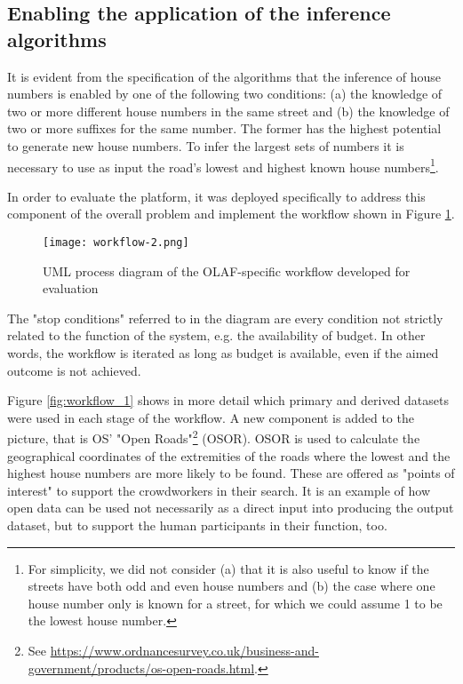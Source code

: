 \subsection{Enabling the application of the inference algorithms} 

It is evident from the specification of the algorithms that the inference of house numbers is enabled by one of the following two conditions: (a) the knowledge of two or more different house numbers in the same street and (b) the knowledge of two or more suffixes for the same number. The former has the highest potential to generate new house numbers. To infer the largest sets of numbers it is necessary to use as input the road's lowest and highest known house numbers\footnote{For simplicity, we did not consider (a) that it is also useful to know if the streets have both odd and even house numbers and (b) the case where one house number only is known for a street, for which we could assume 1 to be the lowest house number.}.

In order to evaluate the platform, it was deployed specifically to address this component of the overall problem and implement the workflow shown in Figure \ref{fig:workflow_2}.

\begin{figure}
	\texttt{[image: workflow-2.png]}
	\caption{UML process diagram of the OLAF-specific workflow developed for evaluation}
	\label{fig:workflow_2}
\end{figure}

The "stop conditions" referred to in the diagram are every condition not strictly related to the function of the system, e.g. the availability of budget. In other words, the workflow is iterated as long as budget is available, even if the aimed outcome is not achieved. 

Figure \ref{fig:workflow_1} shows in more detail which primary and derived datasets were used in each stage of the workflow. A new component is added to the picture, that is OS' "Open Roads"\footnote{See \url{https://www.ordnancesurvey.co.uk/business-and-government/products/os-open-roads.html}.} (OSOR). OSOR is used to calculate the geographical coordinates of the extremities of the roads where the lowest and the highest house numbers are more likely to be found. These are offered as "points of interest" to support the crowdworkers in their search. It is an example of how open data can be used not necessarily as a direct input into producing the output dataset, but to support the human participants in their function, too.

